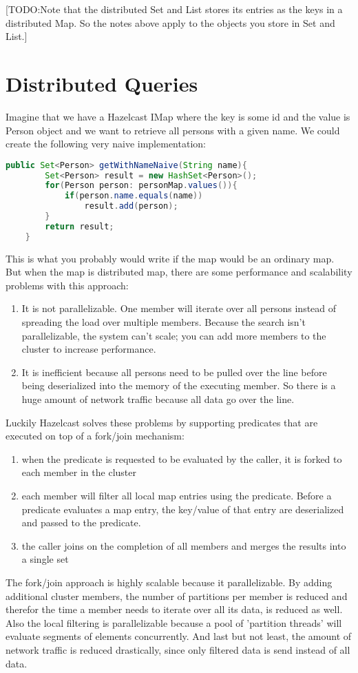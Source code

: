 [TODO:Note that the distributed Set and List stores its entries as the keys in a distributed Map. So the notes above apply to the objects you store in Set and List.]

\section{Distributed Queries}
Imagine that we have a Hazelcast IMap where the key is some id and the value is Person object and we want to retrieve all persons with a given name. We could create the following very naive implementation:
\begin{lstlisting}[language=java]
   public Set<Person> getWithNameNaive(String name){
        Set<Person> result = new HashSet<Person>();
        for(Person person: personMap.values()){
            if(person.name.equals(name))
                result.add(person);
        }
        return result;
    }
\end{lstlisting}
This is what you probably would write if the map would be an ordinary map. But when the map is distributed map, there are some performance and scalability problems with this approach:
\begin{enumerate}
\item It is not parallelizable. One member will iterate over all persons instead of spreading the load over multiple members. Because the search isn't parallelizable, the system can't scale; you can add more members to the cluster to increase performance.
\item It is inefficient because all persons need to be pulled over the line before being deserialized into the memory of the executing member. So there is a huge amount of network traffic because all data go over the line.
\end{enumerate}

Luckily Hazelcast solves these problems by supporting predicates that are executed on top of a fork/join mechanism:
\begin{enumerate}
\item when the predicate is requested to be evaluated by the caller, it is forked to each member in the cluster
\item each member will filter all local map entries using the predicate. Before a predicate evaluates a map entry, the key/value of that entry are deserialized and passed to the predicate. 
\item the caller joins on the completion of all members and merges the results into a single set
\end{enumerate}
The fork/join approach is highly scalable because it parallelizable. By adding additional cluster members, the number of partitions per member is reduced and therefor the time a member needs to iterate over all its data, is reduced as well. Also the local filtering is parallelizable because a pool of 'partition threads' will evaluate segments of elements concurrently. And last but not least, the amount of network traffic is reduced drastically, since only filtered data is send instead of all data.

